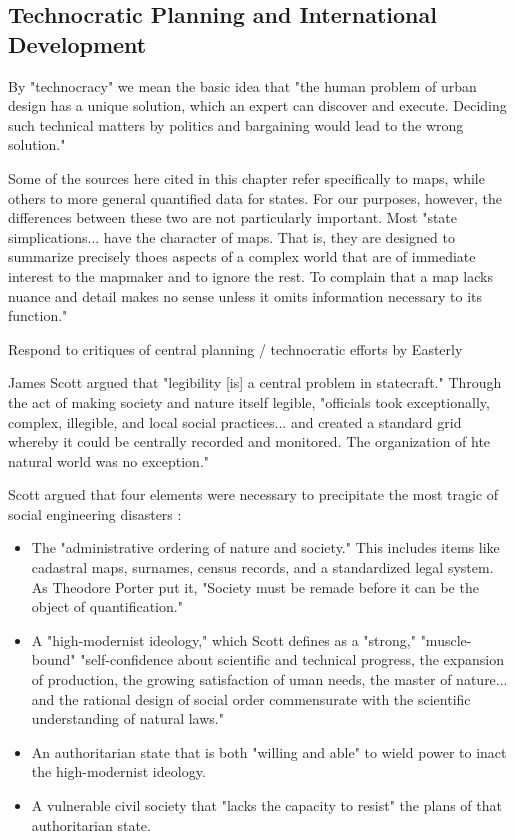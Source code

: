 \subsection{Technocratic Planning and International Development} \label{sec:technocracy}

By "technocracy" we mean the basic idea that "the human problem of urban design has a unique solution, which an expert can discover and execute. Deciding such technical matters by politics and bargaining would lead to the wrong solution." \cite{scottSeeingStateHow2020}


Some of the sources here cited in this chapter refer specifically to maps, while others to more general quantified data for states. For our purposes, however, the differences between these two are not particularly important. Most "state simplications... have the character of maps. That is, they are designed to summarize precisely thoes aspects of a complex world that are of immediate interest to the mapmaker and to ignore the rest. To complain that a map lacks nuance and detail makes no sense unless it omits information necessary to its function." \cite{scottSeeingStateHow2020}


Respond to critiques of central planning / technocratic efforts by Easterly \cite{easterly2015}



James Scott argued that "legibility [is] a central problem in statecraft." Through the act of making society and nature itself legible, "officials took exceptionally, complex, illegible, and local social practices... and created a standard grid whereby it could be centrally recorded and monitored. The organization of hte natural world was no exception."  \cite{scottSeeingStateHow2020}


Scott argued that four elements were necessary to precipitate the most tragic of social engineering disasters \cite{scottSeeingStateHow2020}:

\begin{itemize} \setlength{\itemsep}{0pt} \setlength{\parskip}{0pt} 
	\item{The "administrative ordering of nature and society." This includes items like cadastral maps, surnames, census records, and a standardized legal system. As Theodore Porter put it, "Society must be remade before it can be the object of quantification." \cite{porter1992objectivity}}
	\item{A "high-modernist ideology," which Scott defines as a "strong," "muscle-bound" "self-confidence about scientific and technical progress, the expansion of production, the growing satisfaction of uman needs, the master of nature... and the rational design of social order commensurate with the scientific understanding of natural laws."}
	\item{An authoritarian state that is both "willing and able" to wield power to inact the high-modernist ideology.}
	\item{A vulnerable civil society that "lacks the capacity to resist" the plans of that authoritarian state.}
\end{itemize}


